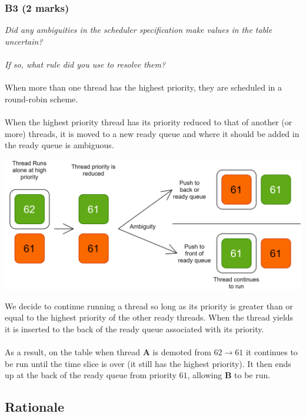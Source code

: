 \documentclass{report}
\newcommand{\question}[1]{\textit{#1} \\ }
\newcommand{\keyword}[1]{\textbf{#1}}
\begin{document}
            \subsubsection*{B3  (2 marks) }
                \question{Did any ambiguities in the scheduler specification make values in the table uncertain? 
                \\ \\ If so, what rule did you use to resolve them?}
                \\ When more than one thread has the highest priority, they are scheduled in a round-robin scheme.
                \\ \\ When the highest priority thread has its priority reduced to that of another (or more) threads, 
                it is moved to a new ready queue and where it should be added in the ready queue is ambiguous.
                \begin{center}
                    \includegraphics[width=\textwidth]{ambiguity.png}
                \end{center}
                We decide to continue running a thread so long as its priority is greater than or equal to the highest 
                priority of the other ready threads. When the thread yields it is inserted to the back of the ready queue associated 
                with its priority.
                \\ \\ As a result, on the table when thread \keyword{A} is demoted from $62 \to 61$ it continues to 
                be run until the time slice is over (it still has the highest priority). It then ends up at the back of 
                the ready queue from priority $61$, allowing \keyword{B} to be run.


        \subsection*{Rationale}
\end{document}
